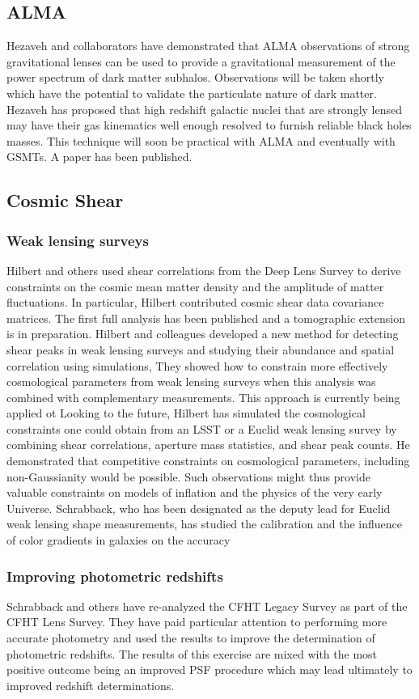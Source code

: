 \documentclass[psfig,11pt]{article}
\begin{document}
\subsection{ALMA}
Hezaveh and collaborators have demonstrated that ALMA observations of  strong gravitational lenses can be used to provide a gravitational measurement of the power spectrum of dark matter subhalos. Observations will be taken shortly which have the potential to validate the particulate nature of dark matter. Hezaveh has proposed that high redshift galactic nuclei that are strongly lensed may have their gas kinematics well enough resolved to furnish reliable black holes masses.  This technique will soon be practical with ALMA and eventually with GSMTs. A paper has been published.
\subsection{Cosmic Shear}
\subsubsection{Weak lensing surveys}
Hilbert and others used shear correlations from the Deep Lens Survey to derive constraints on the cosmic mean matter density and the amplitude of matter fluctuations. In particular, Hilbert contributed cosmic shear data covariance matrices. The first full analysis has been published and a tomographic extension is in preparation. Hilbert and colleagues developed a new method for detecting shear peaks in weak lensing surveys and studying their abundance and spatial correlation using simulations, They showed how to constrain more effectively cosmological parameters from weak lensing surveys when this analysis was combined with complementary measurements. This approach is currently being applied ot
 Looking to the future, Hilbert has simulated the cosmological constraints one could obtain from an LSST or a Euclid weak lensing survey by combining shear correlations, aperture mass statistics, and shear peak counts. He demonstrated that competitive constraints on cosmological parameters, including non-Gaussianity would be possible. Such observations might thus provide valuable constraints on models of inflation and the physics of the very early Universe. Schrabback, who has been designated as the deputy lead for Euclid weak lensing shape measurements, has studied the calibration and the influence of color gradients in galaxies on the accuracy
\subsubsection{Improving photometric redshifts}
Schrabback and others have re-analyzed the CFHT Legacy Survey as part of the CFHT Lens Survey. They have paid particular attention to performing more accurate photometry and used the results to improve the determination of photometric redshifts. The results of this exercise are mixed with the most positive outcome being an improved PSF procedure which may lead ultimately to improved redshift determinations.
\end{document}
